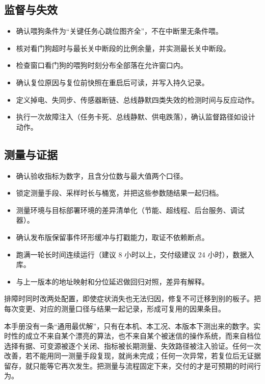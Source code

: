 \documentclass[12pt,a4paper,fontset=fandol]{ctexbook}
\begin{document}
\subsection{监督与失效}

\begin{itemize}
\item 确认喂狗条件为``关键任务心跳位图齐全''，不在中断里无条件喂。
\item 核对看门狗超时与最长关中断段的比例余量，并实测最长关中断段。
\item 检查窗口看门狗的喂狗时刻分布全部落在允许窗口内。
\item 确认复位原因与复位前快照在重启后可读，并写入持久记录。
\item 定义掉电、失同步、传感器断链、总线静默四类失效的检测时间与反应动作。
\item 执行一次故障注入（任务卡死、总线静默、供电跌落），确认监督路径如设计动作。
\end{itemize}

\subsection{测量与证据}

\begin{itemize}
\item 确认验收指标为数字，且含分位数与最大值两个口径。
\item 锁定测量手段、采样时长与桶宽，并把这些参数随结果一起归档。
\item 测量环境与目标部署环境的差异清单化（节能、超线程、后台服务、调试器）。
\item 确认发布版保留事件环形缓冲与打戳能力，取证不依赖断点。
\item 跑满一轮长时间连续运行（建议 8 小时以上，交付级建议 24 小时），数据入库。
\item 与上一版本的地址映射和分位延迟做回归对照，差异有解释。
\end{itemize}

\begin{bestpractice}[title={一次只动一个变量}]
排障时同时改两处配置，即使症状消失也无法归因，修复不可迁移到别的板子。把每次变更、对应的测量口径与结果一起记录，形成可复用的因果条目。
\end{bestpractice}

本手册没有一条``通用最优解''，只有在本机、本工况、本版本下测出来的数字。实时性的成立不来自某个漂亮的算法，也不来自某个被迷信的操作系统，而来自档位选择有据、可变源被逐个关闭、指标被长期测量、失效路径被注入验证。任何一次改善，若不能用同一测量手段复现，就尚未完成；任何一次异常，若复位后无证据留存，就只能等它再次发生。把测量与流程固定下来，交付的才是可预期的时间行为。
\end{document}
